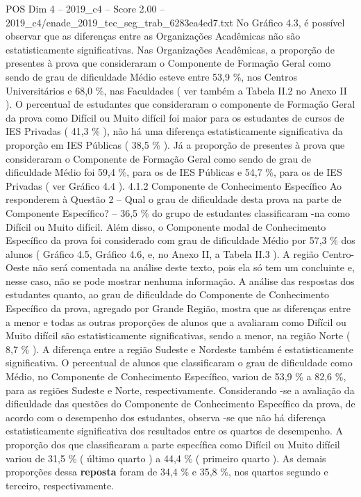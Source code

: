 \begin{textsample}{POS Dim 4 – 2019\_c4 – Score 2.00 – 2019\_c4/enade\_2019\_tec\_seg\_trab\_6283ea4ed7.txt}
No Gráfico 4.3, é possível observar que as diferenças entre as Organizações Acadêmicas não são estatisticamente significativas.
Nas Organizações Acadêmicas, a proporção de presentes à prova que consideraram o Componente de Formação Geral como sendo de grau de dificuldade Médio esteve entre 53,9 \%, nos Centros Universitários e 68,0 \%, nas Faculdades ( ver também a Tabela II.2 no Anexo II ).
O percentual de estudantes que consideraram o componente de Formação Geral da prova como Difícil ou Muito difícil foi maior para os estudantes de cursos de IES Privadas ( 41,3 \% ), não há uma diferença estatisticamente significativa da proporção em IES Públicas ( 38,5 \% ).
Já a proporção de presentes à prova que consideraram o Componente de Formação Geral como sendo de grau de dificuldade Médio foi 59,4 \%, para os de IES Públicas e 54,7 \%, para os de IES Privadas ( ver Gráfico 4.4 ). 4.1.2 Componente de Conhecimento Específico Ao responderem à Questão 2 – Qual o grau de dificuldade desta prova na parte de Componente Específico? – 36,5 \% do grupo de estudantes classificaram -na como Difícil ou Muito difícil.
Além disso, o Componente modal de Conhecimento Específico da prova foi considerado com grau de dificuldade Médio por 57,3 \% dos alunos ( Gráfico 4.5, Gráfico 4.6, e, no Anexo II, a Tabela II.3 ).
A região Centro-Oeste não será comentada na análise deste texto, pois ela só tem um concluinte e, nesse caso, não se pode mostrar nenhuma informação.
A análise das respostas dos estudantes quanto, ao grau de dificuldade do Componente de Conhecimento Específico da prova, agregado por Grande Região, mostra que as diferenças entre a menor e todas as outras proporções de alunos que a avaliaram como Difícil ou Muito difícil são estatisticamente significativas, sendo a menor, na região Norte ( 8,7 \% ).
A diferença entre a região Sudeste e Nordeste também é estatisticamente significativa.
O percentual de alunos que classificaram o grau de dificuldade como Médio, no Componente de Conhecimento Específico, variou de 53,9 \% a 82,6 \%, para as regiões Sudeste e Norte, respectivamente.
Considerando -se a avaliação da dificuldade das questões do Componente de Conhecimento Específico da prova, de acordo com o desempenho dos estudantes, observa -se que não há diferença estatisticamente significativa dos resultados entre os quartos de desempenho.
A proporção dos que classificaram a parte específica como Difícil ou Muito difícil variou de 31,5 \% ( último quarto ) a 44,4 \% ( primeiro quarto ).
As demais proporções dessa \textbf{reposta} foram de 34,4 \% e 35,8 \%, nos quartos segundo e terceiro, respectivamente.

\end{textsample}
